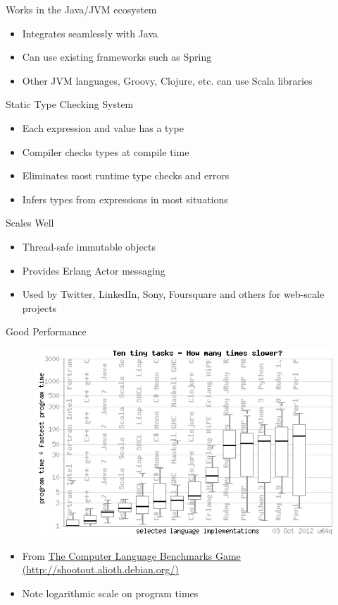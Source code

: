 \documentclass[t]{beamer}
\begin{document}
\begin{frame}{Works in the Java/JVM ecosystem}
  \begin{itemize}
  \item Integrates seamlessly with Java
  \item Can use existing frameworks such as Spring
  \item Other JVM languages, Groovy, Clojure, etc. can use Scala libraries
  \end{itemize}
\note{}
 \end{frame}

\begin{frame}{Static Type Checking System}
  \begin{itemize}
  \item Each expression and value has a type
  \item Compiler checks types at compile time
  \item Eliminates most runtime type checks and errors
  \item Infers types from expressions in most situations
  \end{itemize}
  \note{}
\end{frame}

\begin{frame}{Scales Well}
  \begin{itemize}
  \item Thread-safe immutable objects
  \item Provides Erlang Actor messaging
  \item Used by Twitter, LinkedIn, Sony, Foursquare and others for web-scale projects
  \end{itemize}
  \note{}
\end{frame}

\begin{frame}{Good Performance}
  \begin{figure}
    \includegraphics[scale=0.50]{CLshootout.png}
  \end{figure}
  \begin{itemize}
  \item From \href{http://shootout.alioth.debian.org/}{The Computer 
    Language Benchmarks Game (http://shootout.alioth.debian.org/)}
  \item Note logarithmic scale on program times
  \end{itemize}
\end{frame}
\end{document}
